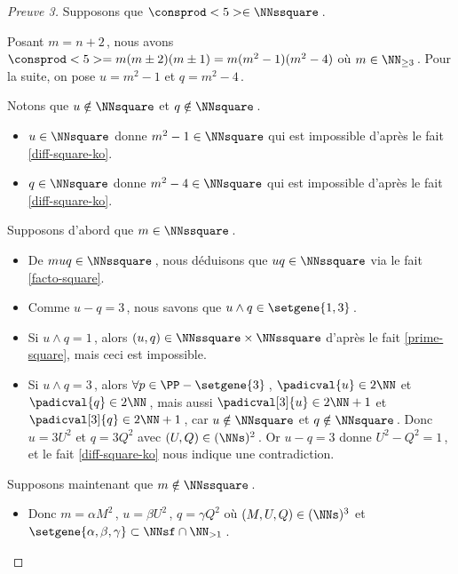 \begin{proof}[Preuve 3]%
	Supposons que $\consprod<5> \in \NNssquare$\,.
	
    \smallskip
    
    Posant $m = n+2$\,, nous avons $\consprod<5> = m (m \pm 2) (m \pm 1) = m(m^2 - 1)(m^2 - 4)$ où $m \in \NN_{\geq 3}$\,.
	Pour la suite, on pose $u = m^2 - 1$ et $q = m^2 - 4$\,.

	\medskip
	
	Notons que $u \notin \NNsquare$ et $q \notin \NNsquare$\,.
	\begin{itemize}
		\item $u \in \NNsquare$ donne $m^2 - 1 \in \NNsquare$ qui est impossible d'après le fait \ref{diff-square-ko}.

		\item $q \in \NNsquare$ donne $m^2 - 4 \in \NNsquare$ qui est impossible d'après le fait \ref{diff-square-ko}.
	\end{itemize}

	\medskip
	
	Supposons d'abord que $m \in \NNssquare$\,.
	\begin{itemize}
		\item De $muq \in \NNssquare$\,, nous déduisons que $uq \in \NNssquare$ via le fait \ref{facto-square}.

		\item Comme $u - q = 3$\,, nous savons que $u \wedge q \in \setgene{1, 3}$\,.

		\item Si $u \wedge q = 1$\,, 
		alors $(u, q) \in \NNssquare \times \NNssquare$ d'après le fait \ref{prime-square}, mais ceci est impossible.

		\item Si $u \wedge q = 3$\,, 
		alors $\forall p \in \PP - \setgene{3}$\,, 
		$\padicval{u} \in 2 \NN$ et $\padicval{q} \in 2 \NN$\,,
		mais aussi $\padicval[3]{u} \in 2 \NN + 1$ et $\padicval[3]{q} \in 2 \NN + 1$\,, car  $u \notin \NNsquare$ et $q \notin \NNsquare$\,.
		Donc 
		$u = 3 U^2$ et $q = 3 Q^2$ avec $(U, Q) \in ( \NNs )^2$\,.
		Or $u - q = 3$ donne $U^2 - Q^2 = 1$\,, et le fait \ref{diff-square-ko} nous indique une contradiction.
	\end{itemize}
	
	\medskip
	
	Supposons maintenant que $m \notin \NNssquare$\,.
	\begin{itemize}
		\item Donc $m = \alpha M^2$\,, $u = \beta U^2$\,, $q = \gamma Q^2$ où $(M, U, Q) \in ( \NNs )^3$ et $\setgene{\alpha, \beta, \gamma} \subset \NNsf \cap \NN_{>1}$\,.



\end{itemize}
\end{proof}
